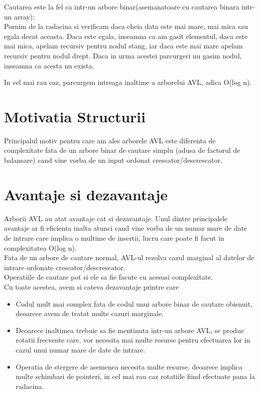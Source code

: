 \documentclass[12pt]{article}
\begin{document}
Cautarea este la fel ca intr-un arbore binar(asemanatoare cu cautarea binara intr-un array):\\
Pornim de la radacina si verificam daca cheia data este mai mare, mai mica sau egala decat aceasta.
Daca este egala, inseamna ca am gasit elementul, daca este mai mica, apelam recursiv pentru nodul stang, iar daca este mai mare apelam recursiv pentru nodul drept.
Daca in urma acestei parcurgeri nu gasim nodul, inseamna ca acesta nu exista.

In cel mai rau caz, parcurgem intreaga inaltime a arborelui AVL, adica O(log n).



\section{Motivatia Structurii}
Principalul motiv pentru care am ales arborele AVL este diferenta de complexitate fata de un arbore binar de cautare simplu (adusa de factorul de balansare) cand vine vorba de un input ordonat crescator/descrescator.\\
\noindent{}



\section{Avantaje si dezavantaje}
Arborii AVL au atat avantaje cat si dezavantaje.
Unul dintre principalele avantaje ar fi eficienta inalta atunci cand vine vorba de un numar mare de date de intrare care implica o multime de insertii, lucru care poate fi facut in complexitatea O(log n). \\Fata de un arbore de cautare normal, AVL-ul rezolva cazul marginal al datelor de intrare ordonate crescator/descrescator. \\Operatiile de cautare pot si ele sa fie facute cu aceeasi complexitate.
\\
Cu toate acestea, avem si cateva dezavantaje printre care
\begin{itemize}
\item Codul mult mai complex fata de codul unui arbore binar de cautare obisnuit, deoarece avem de tratat multe cazuri marginale.
\item Deoarece inaltimea trebuie sa fie mentinuta intr-un arbore AVL, se produc rotatii frecvente care,
vor necesita mai multe resurse pentru efectuarea lor in cazul unui numar mare de date de intrare.
\item Operatia de stergere de asemenea necesita multe resurse, deoarece implica multe schimbari de pointeri, in cel mai rau caz rotatiile fiind efectuate pana la radacina.

\end{itemize}
\end{document}
